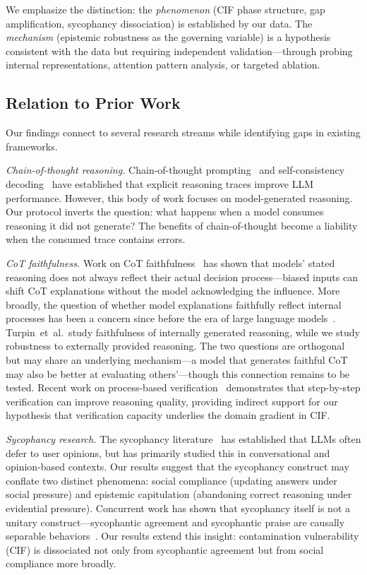\documentclass[aps,prx,reprint,twocolumn,superscriptaddress,longbibliography]{revtex4-2}
\begin{document}
We emphasize the distinction: the \emph{phenomenon} (CIF phase structure, gap amplification, sycophancy dissociation) is established by our data. The \emph{mechanism} (epistemic robustness as the governing variable) is a hypothesis consistent with the data but requiring independent validation---through probing internal representations, attention pattern analysis, or targeted ablation.

\subsection{Relation to Prior Work}

Our findings connect to several research streams while identifying gaps in existing frameworks.

\emph{Chain-of-thought reasoning.}
Chain-of-thought prompting~\cite{wei2022chain} and self-consistency decoding~\cite{wang2023self} have established that explicit reasoning traces improve LLM performance. However, this body of work focuses on model-generated reasoning. Our protocol inverts the question: what happens when a model consumes reasoning it did not generate? The benefits of chain-of-thought become a liability when the consumed trace contains errors.

\emph{CoT faithfulness.}
Work on CoT faithfulness~\cite{turpin2023language,lanham2023measuring} has shown that models' stated reasoning does not always reflect their actual decision process---biased inputs can shift CoT explanations without the model acknowledging the influence. More broadly, the question of whether model explanations faithfully reflect internal processes has been a concern since before the era of large language models~\cite{jacovi2020towards}. Turpin~et~al.\ study faithfulness of internally generated reasoning, while we study robustness to externally provided reasoning. The two questions are orthogonal but may share an underlying mechanism---a model that generates faithful CoT may also be better at evaluating others'---though this connection remains to be tested. Recent work on process-based verification~\cite{lightman2023lets} demonstrates that step-by-step verification can improve reasoning quality, providing indirect support for our hypothesis that verification capacity underlies the domain gradient in CIF.

\emph{Sycophancy research.}
The sycophancy literature~\cite{sharma2023towards,perez2023discovering,wei2023simple} has established that LLMs often defer to user opinions, but has primarily studied this in conversational and opinion-based contexts. Our results suggest that the sycophancy construct may conflate two distinct phenomena: social compliance (updating answers under social pressure) and epistemic capitulation (abandoning correct reasoning under evidential pressure). Concurrent work has shown that sycophancy itself is not a unitary construct---sycophantic agreement and sycophantic praise are causally separable behaviors~\cite{kim2025sycophancy}. Our results extend this insight: contamination vulnerability (CIF) is dissociated not only from sycophantic agreement but from social compliance more broadly.
\end{document}
